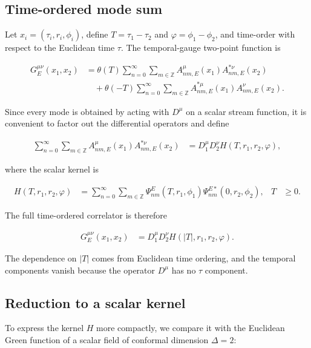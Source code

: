 \subsection{Time-ordered mode sum}\label{subsec:mode-sum}

Let $x_{i}=(\tau_{i},r_{i},\phi_{i})$, define $T=\tau_{1}-\tau_{2}$ and $\varphi=\phi_{1}-\phi_{2}$, and time-order with respect to the Euclidean time $\tau$. The temporal-gauge two-point function is

\begin{align}
G_{E}^{\mu\nu}(x_{1},x_{2})&=\theta(T)\sum_{n=0}^{\infty}\sum_{m\in\mathbb{Z}}A_{nm,E}^{\mu}(x_{1})A_{nm,E}^{*\nu}(x_{2}) \\
&\quad+\theta(-T)\sum_{n=0}^{\infty}\sum_{m\in\mathbb{Z}}A_{nm,E}^{*\mu}(x_{1})A_{nm,E}^{\nu}(x_{2}).
\end{align}

Since every mode is obtained by acting with $D^{\mu}$ on a scalar stream function, it is convenient to factor out the differential operators and define

\begin{align}
\sum_{n=0}^{\infty}\sum_{m\in\mathbb{Z}}A_{nm,E}^{\mu}(x_{1})A_{nm,E}^{*\nu}(x_{2})&=D_{1}^{\mu}D_{2}^{\nu}H(T,r_{1},r_{2},\varphi),
\end{align}

where the scalar kernel is

\begin{align}
H(T,r_{1},r_{2},\varphi)&=\sum_{n=0}^{\infty}\sum_{m\in\mathbb{Z}}\Psi_{nm}^{E}(T,r_{1},\phi_{1})\Psi_{nm}^{E*}(0,r_{2},\phi_{2}), &
T&\geq0.
\end{align}

The full time-ordered correlator is therefore

\begin{align}
G_{E}^{\mu\nu}(x_{1},x_{2})&=D_{1}^{\mu}D_{2}^{\nu}H(|T|,r_{1},r_{2},\varphi).
\end{align}

The dependence on $|T|$ comes from Euclidean time ordering, and the temporal components vanish because the operator $D^{\mu}$ has no $\tau$ component.

\subsection{Reduction to a scalar kernel}\label{subsec:scalar-mode-sum}

To express the kernel $H$ more compactly, we compare it with the Euclidean Green function of a scalar field of conformal dimension $\Delta=2$:

